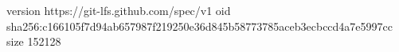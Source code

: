 version https://git-lfs.github.com/spec/v1
oid sha256:c166105f7d94ab657987f219250e36d845b58773785aceb3ecbccd4a7e5997cc
size 152128
